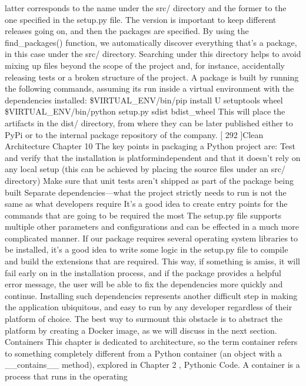 \documentclass[a4paper,10pt,english]{sphinxmanual}
\begin{document}
latter corresponds to the name under the src/ directory and the former to the one specified
in the setup.py file.
The version is important to keep different releases going on, and then the packages are
specified. By using the find\_packages() function, we automatically discover everything
that’s a package, in this case under the src/ directory. Searching under this directory helps
to avoid mixing up files beyond the scope of the project and, for instance, accidentally
releasing tests or a broken structure of the project.
A package is built by running the following commands, assuming its run inside a virtual
environment with the dependencies installed:
\$VIRTUAL\_ENV/bin/pip install \sphinxhyphen{}U setuptools wheel
\$VIRTUAL\_ENV/bin/python setup.py sdist bdist\_wheel
This will place the artifacts in the dist/ directory, from where they can be later published
either to PyPi or to the internal package repository of the company.
{[} 292 {]}Clean Architecture
Chapter 10
The key points in packaging a Python project are:
Test and verify that the installation is platform\sphinxhyphen{}independent and that it doesn’t
rely on any local setup (this can be achieved by placing the source files under an
src/ directory)
Make sure that unit tests aren’t shipped as part of the package being built
Separate dependencies—what the project strictly needs to run is not the same as
what developers require
It’s a good idea to create entry points for the commands that are going to be
required the most
The setup.py file supports multiple other parameters and configurations and can be
effected in a much more complicated manner. If our package requires several operating
system libraries to be installed, it’s a good idea to write some logic in the setup.py file to
compile and build the extensions that are required. This way, if something is amiss, it will
fail early on in the installation process, and if the package provides a helpful error message,
the user will be able to fix the dependencies more quickly and continue.
Installing such dependencies represents another difficult step in making the application
ubiquitous, and easy to run by any developer regardless of their platform of choice. The
best way to surmount this obstacle is to abstract the platform by creating a Docker image,
as we will discuss in the next section.
Containers
This chapter is dedicated to architecture, so the term container refers to something
completely different from a Python container (an object with a \_\_contains\_\_ method),
explored in Chapter 2 , Pythonic Code. A container is a process that runs in the operating
\end{document}
